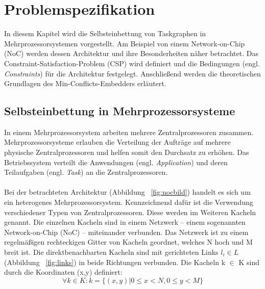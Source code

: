 \chapter{Problemspezifikation}\label{problemspezifikation}

In diesem Kapitel wird die Selbsteinbettung von Taskgraphen in Mehrprozessorsystemen vorgestellt. Am Beispiel von einem Network-on-Chip (NoC) werden dessen Architektur und ihre Besonderheiten näher betrachtet. Das Constraint-Satisfaction-Problem (CSP) wird definiert und die Bedingungen (engl. \textit{Constraints}) für die Architektur festgelegt. Anschließend werden die theoretischen Grundlagen des Min-Conflicts-Embedders erläutert.

\section{Selbsteinbettung in Mehrprozessorsysteme}
In einem Mehrprozessorsystem \cite{Mehrprozessorsysteme} arbeiten mehrere Zentralprozessoren zusammen. 
Mehrprozessorsysteme erlauben die Verteilung der Aufträge auf mehrere physische Zentralprozessoren und helfen somit den Durchsatz zu erhöhen. Das Betriebssystem verteilt die Anwendungen (engl. \textit{Application}) und deren Teilaufgaben (engl. \textit{Task}) an die Zentralprozessoren.  \\%
 


\ \\
Bei der betrachteten Architektur (Abbildung ~\ref{fig:nocbild}) handelt es sich um ein heterogenes Mehrprozessorsystem. Kennzeichnend dafür ist die Verwendung verschiedener Typen von Zentralprozessoren. Diese werden im Weiteren Kacheln genannt. Die einzelnen Kacheln sind in einem Netzwerk -- einem sogenannten Network-on-Chip (NoC) \cite{mappingNocArchitectures} \cite{NOC} -- miteinander verbunden. Das Netzwerk ist zu einem regelmäßigen rechteckigen Gitter von Kacheln geordnet, welches N hoch und M breit ist. Die direktbenachbarten Kacheln sind mit gerichteten Links  $l_i \in L$ (Abbildung ~\ref{fig:links}) in beide Richtungen verbunden. Die Kacheln k $\in$ K sind durch die Koordinaten (x,y) definiert:
\begin{equation} 
 \forall k \in K: k = \{(x, y) | 0 \leq x < N , 0 \leq y < M \}
\label{kacheln}
\end{equation}

